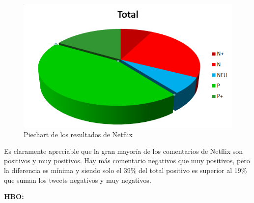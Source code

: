 \begin{figure}[H]
	\centering
	\includegraphics[scale=1]{imagenes/piechartNetflixAll.PNG}
	\caption{Piechart de los resultados de Netflix}
	\label{fig:piechartNetflixAll}
\end{figure}


Es claramente apreciable que la gran mayoría de los comentarios de Netflix son positivos y muy positivos. Hay más comentario negativos que muy positivos,  pero la diferencia es mínima y siendo solo el 39\% del total positivo es superior al 19\% que suman los tweets negativos y muy negativos. 




\textbf{HBO: }

